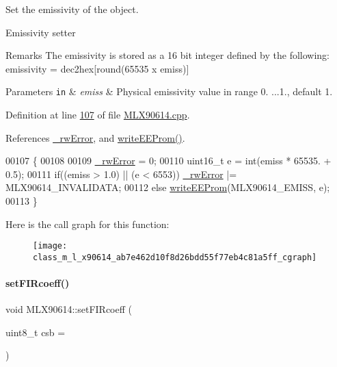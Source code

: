 Set the emissivity of the object. 

Emissivity setter

\begin{DoxyRemark}{Remarks}
The emissivity is stored as a 16 bit integer defined by the following\+: ~\newline
{\ttfamily  emissivity = dec2hex\mbox{[}round(65535 x emiss)\mbox{]}} 
\end{DoxyRemark}

\begin{DoxyParams}[1]{Parameters}
\mbox{\tt in}  & {\em emiss} & Physical emissivity value in range 0. ...1., default 1. \\
\hline
\end{DoxyParams}


Definition at line \mbox{\hyperlink{_m_l_x90614_8cpp_source_l00107}{107}} of file \mbox{\hyperlink{_m_l_x90614_8cpp_source}{M\+L\+X90614.\+cpp}}.



References \mbox{\hyperlink{_m_l_x90614_8h_source_l00146}{\+\_\+rw\+Error}}, and \mbox{\hyperlink{_m_l_x90614_8cpp_source_l00354}{write\+E\+E\+Prom()}}.


\begin{DoxyCode}
00107                                         \{
00108 
00109     \mbox{\hyperlink{class_m_l_x90614_a8c203cc9359c283d07682ba7dbcc5de3}{\_rwError}} = 0;
00110     uint16\_t e = int(emiss * 65535. + 0.5);
00111     \textcolor{keywordflow}{if}((emiss > 1.0) || (e < 6553)) \mbox{\hyperlink{class_m_l_x90614_a8c203cc9359c283d07682ba7dbcc5de3}{\_rwError}} |= MLX90614\_INVALIDATA;
00112     \textcolor{keywordflow}{else} \mbox{\hyperlink{class_m_l_x90614_a70b3e428c623b6af5bedf199f5c16490}{writeEEProm}}(MLX90614\_EMISS, e);
00113 \}
\end{DoxyCode}
Here is the call graph for this function\+:\nopagebreak
\begin{figure}[H]
\begin{center}
\leavevmode
\texttt{[image: class\_m\_l\_x90614\_ab7e462d10f8d26bdd55f77eb4c81a5ff\_cgraph]}
\end{center}
\end{figure}
\mbox{\label{class_m_l_x90614_a3849320b7988ca5882f25fbc87dd0de7}} 
\paragraph{\texorpdfstring{set\+F\+I\+Rcoeff()}{setFIRcoeff()}}
{\footnotesize\ttfamily void M\+L\+X90614\+::set\+F\+I\+Rcoeff (\begin{DoxyParamCaption}\item[{uint8\+\_\+t}]{csb = {} }\end{DoxyParamCaption})}



